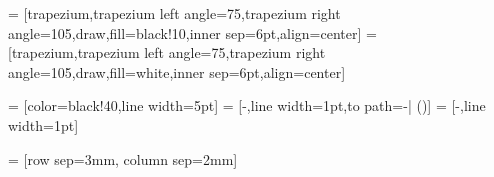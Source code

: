 %

 = [trapezium,trapezium left angle=75,trapezium right angle=105,draw,fill=black!10,inner sep=6pt,align=center]
 = [trapezium,trapezium left angle=75,trapezium right angle=105,draw,fill=white,inner sep=6pt,align=center]


%

 = [color=black!40,line width=5pt]
 = [-,line width=1pt,to path={-| (\tikztotarget)}]
 = [-,line width=1pt]


 = [row sep=3mm, column sep=2mm]


